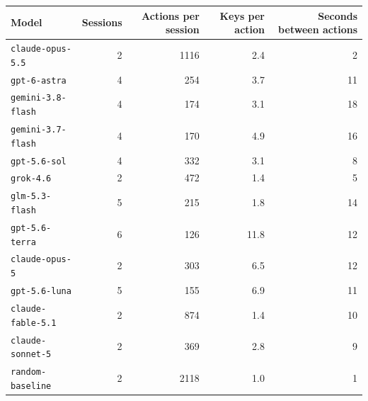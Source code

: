 \begin{tabular}{@{}lrrrr@{}}
\toprule
Model & Sessions & Actions per session & Keys per action & Seconds between actions \\
\midrule
\texttt{claude-opus-5.5} & 2 & 1116 & 2.4 & 2 \\
\texttt{gpt-6-astra} & 4 & 254 & 3.7 & 11 \\
\texttt{gemini-3.8-flash} & 4 & 174 & 3.1 & 18 \\
\texttt{gemini-3.7-flash} & 4 & 170 & 4.9 & 16 \\
\texttt{gpt-5.6-sol} & 4 & 332 & 3.1 & 8 \\
\texttt{grok-4.6} & 2 & 472 & 1.4 & 5 \\
\texttt{glm-5.3-flash} & 5 & 215 & 1.8 & 14 \\
\texttt{gpt-5.6-terra} & 6 & 126 & 11.8 & 12 \\
\texttt{claude-opus-5} & 2 & 303 & 6.5 & 12 \\
\texttt{gpt-5.6-luna} & 5 & 155 & 6.9 & 11 \\
\texttt{claude-fable-5.1} & 2 & 874 & 1.4 & 10 \\
\texttt{claude-sonnet-5} & 2 & 369 & 2.8 & 9 \\
\midrule
\texttt{random-baseline} & 2 & 2118 & 1.0 & 1 \\
\bottomrule
\end{tabular}
